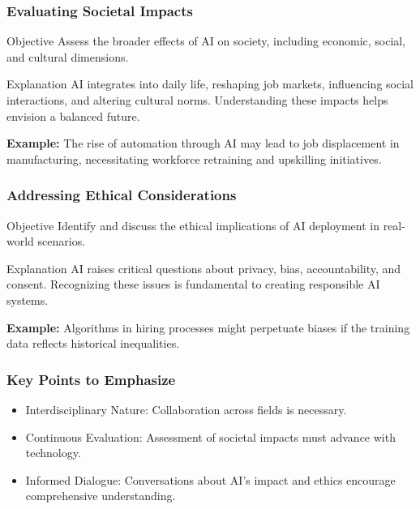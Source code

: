 \documentclass[aspectratio=169]{beamer}
\begin{document}
\begin{frame}[fragile]
    \frametitle{Evaluating Societal Impacts}
    \begin{block}{Objective}
        Assess the broader effects of AI on society, including economic, social, and cultural dimensions.
    \end{block}
    \begin{block}{Explanation}
        AI integrates into daily life, reshaping job markets, influencing social interactions, and altering cultural norms. Understanding these impacts helps envision a balanced future.
    \end{block}
    \begin{example}
        \textbf{Example:} The rise of automation through AI may lead to job displacement in manufacturing, necessitating workforce retraining and upskilling initiatives.
    \end{example}
\end{frame}

\begin{frame}[fragile]
    \frametitle{Addressing Ethical Considerations}
    \begin{block}{Objective}
        Identify and discuss the ethical implications of AI deployment in real-world scenarios.
    \end{block}
    \begin{block}{Explanation}
        AI raises critical questions about privacy, bias, accountability, and consent. Recognizing these issues is fundamental to creating responsible AI systems.
    \end{block}
    \begin{example}
        \textbf{Example:} Algorithms in hiring processes might perpetuate biases if the training data reflects historical inequalities.
    \end{example}
\end{frame}

\begin{frame}[fragile]
    \frametitle{Key Points to Emphasize}
    \begin{itemize}
        \item Interdisciplinary Nature: Collaboration across fields is necessary.
        \item Continuous Evaluation: Assessment of societal impacts must advance with technology.
        \item Informed Dialogue: Conversations about AI's impact and ethics encourage comprehensive understanding.
    \end{itemize}
\end{frame}
\end{document}
